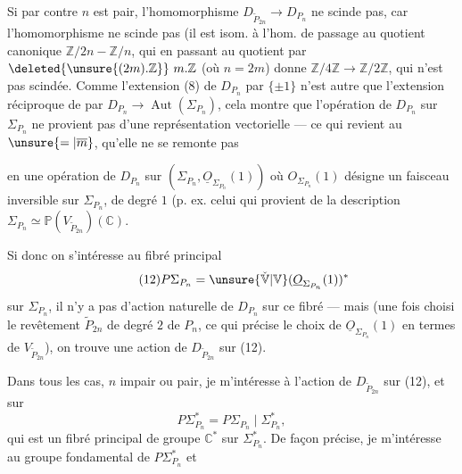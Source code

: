 Si par contre $n$ est pair, l'homomorphisme  $D_{\widetilde P_{2n}}\longrightarrow D_{P_n}$ ne scinde pas, car l'homomorphisme
ne scinde pas (il est isom. à l'hom. de passage au quotient canonique $\mathbb Z/2n\mathbin{-}\mathbb Z/n$, qui en passant au quotient par $\deleted{\unsure{(2m).\mathbb Z}}\ m.\mathbb Z$ (où $n=2m$) donne $\mathbb Z/4\mathbb Z\longrightarrow\mathbb Z/2\mathbb Z$, qui n'est pas scindée.  Comme l'extension (8) de $D_{P_n}$ par $\{\pm1\}$ n'est autre que l'extension réciproque de
par $D_{P_n}\longrightarrow\operatorname{Aut}(\Sigma_{P_n})$, cela montre que l'opération de $D_{P_n}$ sur $\Sigma_{P_n}$ ne provient pas d'une représentation vectorielle —  ce qui revient au $\unsure{=|\overline m}$, qu'elle ne se remonte pas

en une opération de $D_{P_n}$ sur $(\Sigma_{P_n},\underline O_{\Sigma_{P_n}}(1))$ où $O_{\Sigma_{P_n}}(1)$ désigne un faisceau inversible sur $\Sigma_{P_n}$, de degré $1$ (p. ex. celui qui provient de la description  $\Sigma_{P_n}\simeq\mathbb P(V_{\widetilde P_{2n}})(\mathbb C)$.

Si donc on s'intéresse au fibré principal
\[
\tag{12}P\Sigma_{P_n}=\unsure{\check{\mathbb V}|\mathbb V}(\underline O_{\Sigma_{P_n}}(1))^*
\]
sur $\Sigma_{P_n}$, il n'y a pas d'action naturelle de $D_{P_n}$ sur ce fibré — mais (une fois choisi le revêtement $\widetilde P_{2n}$ de degré $2$ de $P_n$,  ce qui précise le choix de $\underline O_{\Sigma_{P_n}}(1)$ en termes de $V_{\widetilde P_{2n}}$), on trouve une action de $D_{\widetilde P_{2n}}$ sur (12).

Dans tous les cas, $n$ impair ou pair, je m'intéresse à l'action de $D_{\widetilde P_{2n}}$ sur (12), et sur 
\[
\tag{13}P\Sigma_{P_n}^*=P\Sigma_{P_n}\mid\Sigma_{P_n}^*,
\]
qui est un fibré principal de groupe $\mathbb C^*$ sur $\Sigma_{P_n}^*$. De façon précise, je m'intéresse au groupe fondamental de $P\Sigma_{P_n}^*$ et 


